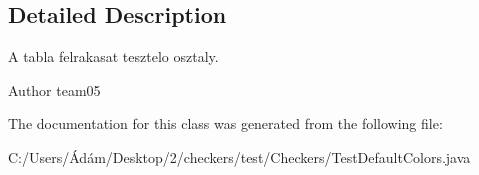 \subsection{Detailed Description}
A tabla felrakasat tesztelo osztaly. 

\begin{DoxyAuthor}{Author}
team05 
\end{DoxyAuthor}


The documentation for this class was generated from the following file\+:\begin{DoxyCompactItemize}
\item 
C\+:/\+Users/Ádám/\+Desktop/2/checkers/test/\+Checkers/Test\+Default\+Colors.\+java\end{DoxyCompactItemize}
